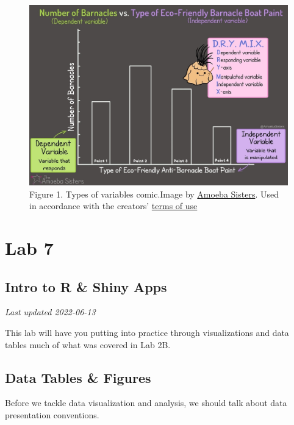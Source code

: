\documentclass[
]{book}
\begin{document}
\begin{figure}
\centering
\includegraphics{figures_images/Lab6-Fig1.jpg}
\caption{Figure 1. Types of variables comic.Image by \href{https://www.amoebasisters.com/parameciumparlorcomics/category/nature-of-science/2}{Amoeba Sisters}. Used in accordance with the creators' \href{https://www.amoebasisters.com/termsofuse.html}{terms of use}}
\end{figure}

\hypertarget{part-lab-7}{%
\part*{Lab 7}\label{part-lab-7}}

\hypertarget{intro-to-r-shiny-apps}{%
\chapter*{Intro to R \& Shiny Apps}\label{intro-to-r-shiny-apps}}

\emph{Last updated 2022-06-13}

This lab will have you putting into practice through visualizations and data tables much of what was covered in Lab 2B.

\hypertarget{data-tables-figures}{%
\chapter*{Data Tables \& Figures}\label{data-tables-figures}}

Before we tackle data visualization and analysis, we should talk about data presentation conventions.
\end{document}
